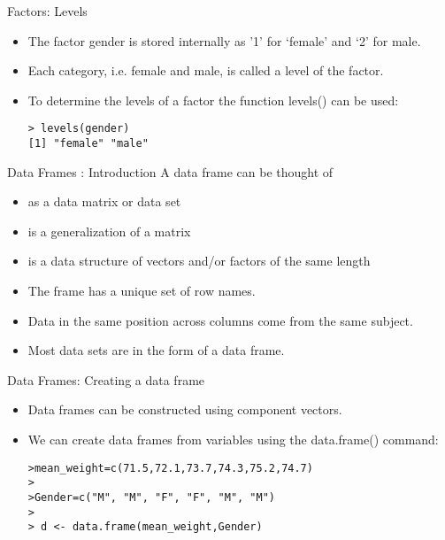 \documentclass[pdf,default,slideColor,colorBG]{prosper}
\begin{document}
\begin{slide}{Factors: Levels}
\begin{itemize} \item The factor gender is stored internally as '1' for `female'
and `2' for male. \item Each category, i.e. female and male, is
called a level of the factor.  \item To determine the levels of a
factor the function levels() can be used:

\begin{verbatim}
> levels(gender)
[1] "female" "male"
\end{verbatim}
\end{itemize}
\end{slide}


\begin{slide}{Data Frames : Introduction}
A data frame can be thought of
\begin{itemize}
\item as a data matrix or data set \item is a generalization of a
matrix \item is a data structure of vectors and/or factors of the
same length \item  The frame has a unique set of row names. \item Data in
the same position across columns come from the same subject. \item
Most data sets are in the form of a data frame.
\end{itemize}

\end{slide}

\begin{slide}{Data Frames: Creating a data frame}
\begin{itemize}
\item Data frames can be constructed using component vectors.
\item 
We can create data frames from variables using the data.frame()
command:
\begin{verbatim}
>mean_weight=c(71.5,72.1,73.7,74.3,75.2,74.7)
>
>Gender=c("M", "M", "F", "F", "M", "M")
>
> d <- data.frame(mean_weight,Gender)
\end{verbatim}
\end{itemize}
\end{slide}
\end{document}
